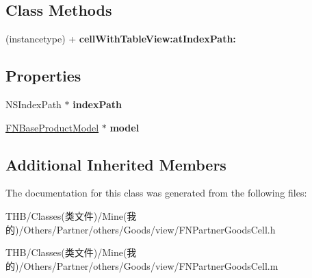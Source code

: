 \subsection*{Class Methods}
\begin{DoxyCompactItemize}
\item 
\mbox{\label{interface_f_n_partner_goods_cell_a6a5ed0dcf54531b37eec12419815f512}} 
(instancetype) + {\bfseries cell\+With\+Table\+View\+:at\+Index\+Path\+:}
\end{DoxyCompactItemize}
\subsection*{Properties}
\begin{DoxyCompactItemize}
\item 
\mbox{\label{interface_f_n_partner_goods_cell_a85aee2b1af4104d7c63b2e9b31b445fb}} 
N\+S\+Index\+Path $\ast$ {\bfseries index\+Path}
\item 
\mbox{\label{interface_f_n_partner_goods_cell_acd6b8be79d29b6622de378912f86edab}} 
\mbox{\hyperlink{interface_f_n_base_product_model}{F\+N\+Base\+Product\+Model}} $\ast$ {\bfseries model}
\end{DoxyCompactItemize}
\subsection*{Additional Inherited Members}


The documentation for this class was generated from the following files\+:\begin{DoxyCompactItemize}
\item 
T\+H\+B/\+Classes(类文件)/\+Mine(我的)/\+Others/\+Partner/others/\+Goods/view/F\+N\+Partner\+Goods\+Cell.\+h\item 
T\+H\+B/\+Classes(类文件)/\+Mine(我的)/\+Others/\+Partner/others/\+Goods/view/F\+N\+Partner\+Goods\+Cell.\+m\end{DoxyCompactItemize}
